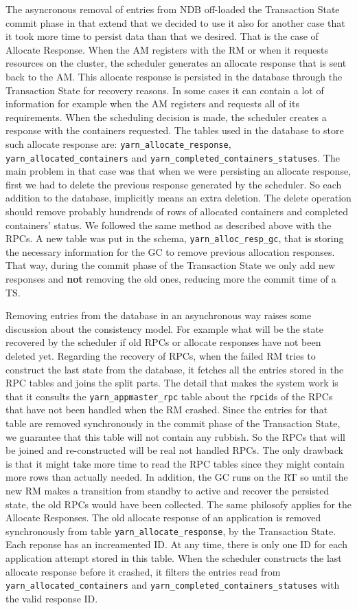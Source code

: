 The asyncronous removal of entries from NDB off-loaded the Transaction
State commit phase in that extend that we decided to use it also for
another case that it took more time to persist data than that we
desired. That is the case of Allocate Response. When the AM registers
with the RM or when it requests resources on the cluster, the
scheduler generates an allocate response that is sent back to the
AM. This allocate response is persisted in the database through the
Transaction State for recovery reasons. In some cases it can contain a
lot of information for example when the AM registers and requests all
of its requirements. When the scheduling decision is made, the scheduler creates a response with the
containers requested. The tables used in the database to store such
allocate response are: \texttt{yarn\_allocate\_response},
\texttt{yarn\_allocated\_containers} and
\texttt{yarn\_completed\_containers\_statuses}. The main problem in
that case was that when we were persisting an allocate response, first we
had to delete the previous response generated by the
scheduler. So each addition to the database, implicitly means an extra
deletion. The delete operation should remove probably hundrends of
rows of allocated containers and completed containers' status. We
followed the same method as described above with the RPCs. A new table
was put in the schema, \texttt{yarn\_alloc\_resp\_gc}, that is
storing the necessary information for the GC to remove previous
allocation responses. That way, during the commit phase of the
Transaction State we only add new responses and \textbf{not} removing
the old ones, reducing more the commit time of a TS.

Removing entries from the database in an asynchronous way raises some
discussion about the consistency model. For example what will be the
state recovered by the scheduler if old RPCs or allocate responses
have not been deleted yet. Regarding the recovery of RPCs, when the
failed RM tries to construct the last state from the database, it
fetches all the entries stored in the RPC tables and joins the split
parts. The detail that makes the system work is that it consults the
\texttt{yarn\_appmaster\_rpc} table about the \texttt{rpcid}s of the
RPCs that have not been handled when the RM crashed. Since the entries
for that table are removed synchronously in the commit phase of the
Transaction State, we guarantee that this table will not contain any
rubbish. So the RPCs that will be joined and re-constructed will be
real not handled RPCs. The only drawback is that it might take more
time to read the RPC tables since they might contain more rows than
actually needed. In addition, the GC runs on the RT so until the new
RM makes a transition from standby to active and recover the persisted
state, the old RPCs would have been collected. The same philosofy
applies for the Allocate Responses. The old allocate response of an
application is removed synchronously from table
\texttt{yarn\_allocate\_response}, by the Transaction State. Each
reponse has an increamented ID. At any time, there is only one ID for
each application attempt stored in this table. When the scheduler
constructs the last allocate response before it crashed, it filters
the entries read from \texttt{yarn\_allocated\_containers} and
\texttt{yarn\_completed\_containers\_statuses} with the valid response ID.